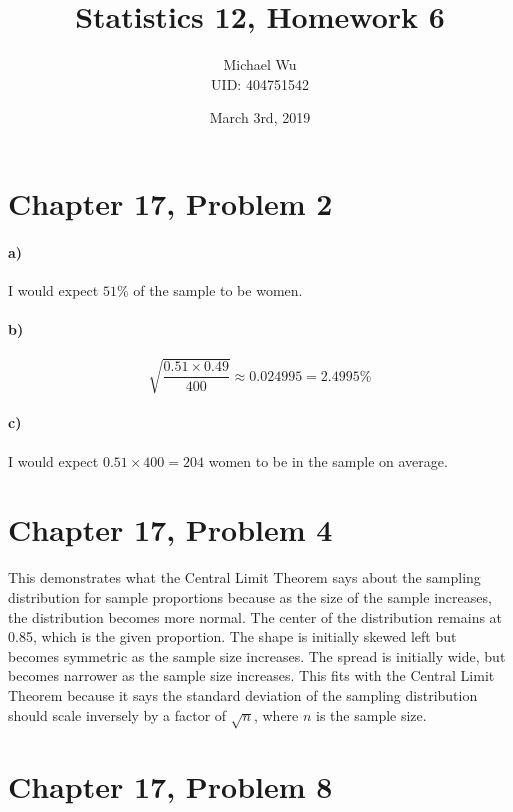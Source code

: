 \documentclass[12pt]{article}
\begin{document}
\title{Statistics 12, Homework 6}
\date{March 3rd, 2019}
\author{Michael Wu\\UID: 404751542}
\maketitle

\section*{Chapter 17, Problem 2}

\paragraph{a)}

I would expect \(51\%\) of the sample to be women.

\paragraph{b)}

\[\sqrt{\frac{0.51\times0.49}{400}}\approx 0.024995 = 2.4995\%\]

\paragraph{c)}

I would expect \(0.51\times400=204\) women to be in the sample on average.

\section*{Chapter 17, Problem 4}

This demonstrates what the Central Limit Theorem says about the sampling distribution
for sample proportions because as the size of the sample increases, the distribution
becomes more normal. The center of the distribution remains at 0.85, which is the
given proportion. The shape is initially skewed left but becomes symmetric as
the sample size increases. The spread is initially wide, but becomes narrower as
the sample size increases. This fits with the Central Limit Theorem because it says the
standard deviation of the sampling distribution should scale inversely by a factor of
\(\sqrt{n}\), where \(n\) is the sample size.

\section*{Chapter 17, Problem 8}
\end{document}
